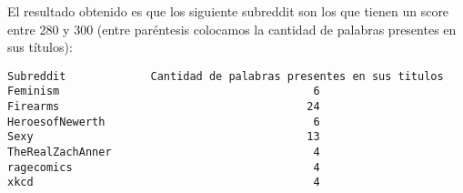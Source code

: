 El resultado obtenido es que los siguiente subreddit son los que tienen un score entre 280 y 300 (entre paréntesis colocamos la cantidad de palabras presentes en sus títulos):
\begin{lstlisting}
Subreddit             Cantidad de palabras presentes en sus titulos
Feminism                                       6
Firearms                                      24
HeroesofNewerth                                6
Sexy                                          13
TheRealZachAnner                               4
ragecomics                                     4
xkcd                                           4
\end{lstlisting}